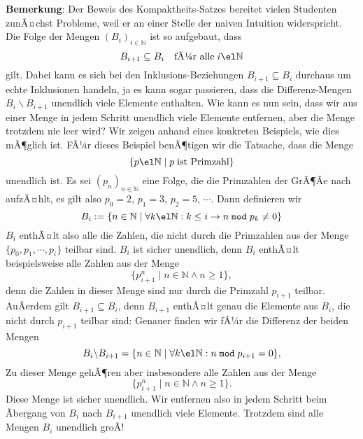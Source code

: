 \noindent
\textbf{Bemerkung}: Der Beweis des Kompaktheits-Satzes bereitet vielen Studenten
zunÃ¤chst Probleme, weil er an einer Stelle der naiven Intuition widerspricht.
Die Folge der Mengen $(B_i)_{i\in\mathbb{N}}$ ist so aufgebaut, dass
\[ B_{i+1} \subseteq B_i \quad \mbox{fÃ¼r alle}\; i \el \mathbb{N} \]
gilt.  Dabei kann es sich bei den Inklusions-Beziehungen $B_{i+1} \subseteq B_i$ durchaus  
um echte Inklusionen handeln, ja es kann sogar passieren, dass die Differenz-Mengen
$B_i \backslash B_{i+1}$ unendlich viele Elemente enthalten.  Wie kann es nun sein, dass
wir aus einer Menge in jedem Schritt unendlich viele Elemente entfernen, aber die Menge
trotzdem nie leer wird?  Wir zeigen anhand eines konkreten Beispiels, wie dies mÃ¶glich
ist.  FÃ¼r dieses Beispiel benÃ¶tigen wir die Tatsache, dass die Menge 
\[ \{ p \el\mathbb{N} \mid p\; \mbox{ist Primzahl} \} \]
unendlich ist.  Es sei $(p_n)_{n\in\mathbb{N}}$ eine Folge, die die Primzahlen der GrÃ¶Ãe
nach aufzÃ¤hlt, es gilt also $p_0 = 2$, $p_1 = 3$, $p_2 = 5$, $\cdots$. 
Dann definieren wir 
\[ B_i := \{ n \in \mathbb{N} \mid \forall k\el\mathbb{N} : k \leq i \rightarrow n\;\mathtt{mod}\; p_k \not= 0 \} \]
$B_i$ enthÃ¤lt also alle die Zahlen, die nicht durch die Primzahlen aus der Menge
$\{p_0,p_1, \cdots, p_i\}$ teilbar sind.  $B_i$ ist sicher unendlich, denn $B_i$ enthÃ¤lt
beispielsweise alle Zahlen aus der Menge
\[ \bigl\{ p_{i+1}^n \mid n \in \mathbb{N} \wedge n \geq 1 \bigr\}, \]
denn die Zahlen in dieser Menge sind nur durch die Primzahl $p_{i+1}$ teilbar.
AuÃerdem gilt $B_{i+1} \subseteq B_i$, denn  $B_{i+1}$ enthÃ¤lt genau die Elemente aus
$B_i$, die nicht durch $p_{i+1}$ teilbar sind: Genauer finden wir
fÃ¼r die Differenz der beiden Mengen 
\[ B_{i} \backslash B_{i+1} = \{ n \in \mathbb{N} \mid \forall k\el\mathbb{N} : n\;\mathtt{mod}\; p_{i+1} = 0 \}, \]
Zu dieser Menge gehÃ¶ren aber insbesondere alle
Zahlen aus der Menge
\[ \bigl\{ p_{i+1}^n \mid n \in \mathbb{N} \wedge n \geq 1 \bigr\}. \]
Diese Menge ist sicher unendlich.  Wir entfernen also in jedem Schritt beim Ãbergang von
$B_i$ nach $B_{i+1}$ unendlich viele Elemente.  Trotzdem sind alle Mengen $B_i$ unendlich
groÃ!



